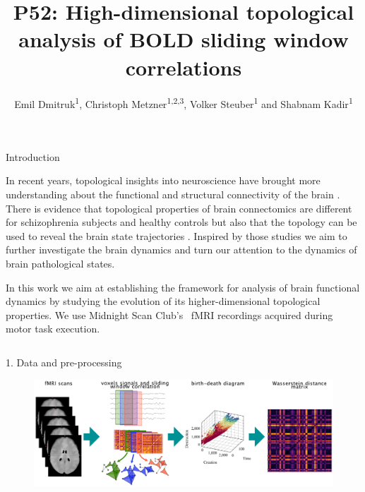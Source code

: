 \documentclass[final]{beamer}
\title[UH poster]{P52: High-dimensional topological analysis of BOLD sliding window correlations}
\author[Dmitruk]{Emil Dmitruk\textsuperscript{1}, Christoph Metzner\textsuperscript{1,2,3}, Volker Steuber\textsuperscript{1} and Shabnam Kadir\textsuperscript{1}
}
\institute[UH]{\textsuperscript{1}University of Hertfordshire, UK; \textsuperscript{2}Technische Universität Berlin, Germany;\textsuperscript{3}Charité-Universitätsmedizin Berlin, Germany}
\begin{document}
\begin{frame}{} 
  \begin{block}{Introduction}
  \small{
      In recent years, topological insights into neuroscience have brought more understanding about the functional and structural connectivity of the brain \cite{Saggar2018a}\cite{Sizemore2018}. There is evidence that topological properties of brain connectomics are different for schizophrenia subjects and healthy controls \cite{Stolz2018} \cite{Dmitruk2021} but also that the topology can be used to reveal the brain state trajectories \cite{Rieck2020a}. Inspired by those studies we aim to further investigate the brain dynamics and turn our attention to the dynamics of brain pathological states.
      
      
    In this work we aim at establishing the framework for analysis of brain functional dynamics by studying the evolution of its higher-dimensional topological properties.
    We use Midnight Scan Club's~\cite{Gordon2017} fMRI recordings acquired during motor task execution.
    }
  \end{block}
\begin{columns}
    \begin{column}{0.65\textwidth}
        \begin{block}{1. Data and pre-processing}
            \begin{figure}[H]
                \centering
                \includegraphics[width=0.9\linewidth]{images/bernstein2022_abstract_top.pdf}
                \label{fig:preproc}
            \end{figure}
\end{block}
\end{column}
\end{columns}
\end{frame}
\end{document}
